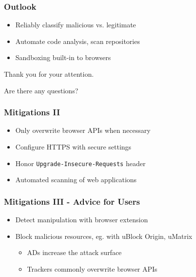 \documentclass[t,aspectratio=169]{beamer}
\begin{document}
\begin{frame}
	\frametitle{Outlook}
	\begin{itemize}
		\item Reliably classify malicious vs. legitimate
		\item Automate code analysis, scan repositories
		\item Sandboxing built-in to browsers
	\end{itemize}
\end{frame}

\begin{frame}[plain]
	\centering
	\vfill
	Thank you for your attention.
	\par
	Are there any questions?
	\vfill
\end{frame}

\begin{frame}
	\frametitle{Mitigations II}
	\begin{itemize}
		\item Only overwrite browser APIs when necessary
		\item Configure HTTPS with secure settings
		\item Honor \texttt{Upgrade-Insecure-Requests} header
		\item Automated scanning of web applications
	\end{itemize}
\end{frame}

\begin{frame}
	\frametitle{Mitigations III - Advice for Users}
	\begin{itemize}
		\item Detect manipulation with browser extension
		\item Block malicious resources, eg. with uBlock Origin, uMatrix
		\begin{itemize}
			\item ADs increase the attack surface %
			\item Trackers commonly overwrite browser APIs
		\end{itemize}
	\end{itemize}
\end{frame}
\end{document}
